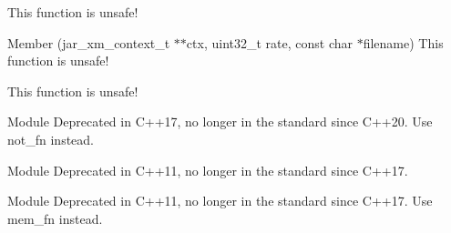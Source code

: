 \begin{DoxyRefList}
\label{deprecated__deprecated000016}%
%
This function is unsafe!  
\item[Member \doxylink{raylib_2src_2external_2jar__xm_8h_af2026fcb105fecaa9eac322caf076ae6}{jar\+\_\+xm\+\_\+create\+\_\+context\+\_\+from\+\_\+file} (jar\+\_\+xm\+\_\+context\+\_\+t \texorpdfstring{$\ast$}{*}\texorpdfstring{$\ast$}{*}ctx, uint32\+\_\+t rate, const char \texorpdfstring{$\ast$}{*}filename)]\label{deprecated__deprecated000011}%
%
This function is unsafe! 

\label{deprecated__deprecated000015}%
%
This function is unsafe!  
\item[Module \doxylink{group__negators}{negators} ]\label{deprecated__deprecated000006}%
%
Deprecated in C++17, no longer in the standard since C++20. Use {\ttfamily not\+\_\+fn} instead. 
\item[Module \doxylink{group__pointer__adaptors}{pointer\+\_\+adaptors} ]\label{deprecated__deprecated000007}%
%
Deprecated in C++11, no longer in the standard since C++17. 
\item[Module \doxylink{group__ptrmem__adaptors}{ptrmem\+\_\+adaptors} ]\label{deprecated__deprecated000008}%
%
Deprecated in C++11, no longer in the standard since C++17. Use {\ttfamily mem\+\_\+fn} instead.
\end{DoxyRefList}